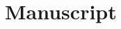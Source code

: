 \documentclass[a4paper,10pt]{book}
\begin{document}
\chapter{Manuscript}

%



% 
% 
% 
\end{document}
